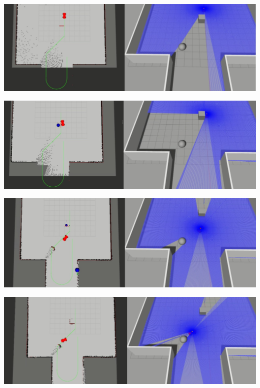 \begin{center}
    \includegraphics[width=\textwidth]{figures/raw/jpeg/local_planner_test_curved_traj_2_static_objects_1.jpg}

    \vspace{0.5cm}
    \includegraphics[width=\textwidth]{figures/raw/jpeg/local_planner_test_curved_traj_2_static_objects_2.jpg}

    \vspace{0.5cm}
    \includegraphics[width=\textwidth]{figures/raw/jpeg/local_planner_test_curved_traj_2_static_objects_3.jpg}

    \vspace{0.5cm}
    \includegraphics[width=\textwidth]{figures/raw/jpeg/local_planner_test_curved_traj_2_static_objects_4.jpg}


\end{center}
